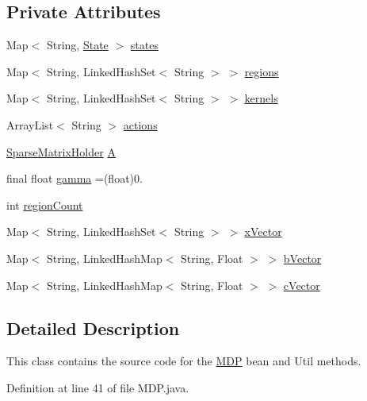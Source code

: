 \subsection*{Private Attributes}
\begin{DoxyCompactItemize}
\item 
Map$<$ String, \hyperlink{classmdp_1_1core_1_1_state}{State} $>$ \hyperlink{classmdp_1_1core_1_1_m_d_p_a62bf7674d88162db7d00cfd82603b24f}{states}
\item 
Map$<$ String, Linked\+Hash\+Set$<$ String $>$ $>$ \hyperlink{classmdp_1_1core_1_1_m_d_p_a79761e7b3bb0d7a083bee7183c992893}{regions}
\item 
Map$<$ String, Linked\+Hash\+Set$<$ String $>$ $>$ \hyperlink{classmdp_1_1core_1_1_m_d_p_ac185a95b0c9eb78b9d5a00b214696191}{kernels}
\item 
Array\+List$<$ String $>$ \hyperlink{classmdp_1_1core_1_1_m_d_p_a9da06680f73a486a6ee65c8208151e70}{actions}
\item 
\hyperlink{classmdp_1_1util_1_1_sparse_matrix_holder}{Sparse\+Matrix\+Holder} \hyperlink{classmdp_1_1core_1_1_m_d_p_ac75a611d9f5186893b70b8072bfa0804}{A}
\item 
final float \hyperlink{classmdp_1_1core_1_1_m_d_p_ab240c1d97d39d6f66cff0c8d06a57a69}{gamma} =(float)0.
\item 
int \hyperlink{classmdp_1_1core_1_1_m_d_p_ae2644b9387e09a5c2ab096c0bb519f8d}{region\+Count}
\item 
Map$<$ String, Linked\+Hash\+Set$<$ String $>$ $>$ \hyperlink{classmdp_1_1core_1_1_m_d_p_a073e9c6d6e349ae034c3cf220d754324}{x\+Vector}
\item 
Map$<$ String, Linked\+Hash\+Map$<$ String, Float $>$ $>$ \hyperlink{classmdp_1_1core_1_1_m_d_p_a16eff8bad86554cc9f97f674b1625c66}{b\+Vector}
\item 
Map$<$ String, Linked\+Hash\+Map$<$ String, Float $>$ $>$ \hyperlink{classmdp_1_1core_1_1_m_d_p_a80af7879a4ff33ac43034eaa934c480f}{c\+Vector}
\end{DoxyCompactItemize}


\subsection{Detailed Description}
This class contains the source code for the \hyperlink{classmdp_1_1core_1_1_m_d_p}{M\+D\+P} bean and Util methods. 

Definition at line 41 of file M\+D\+P.\+java.



